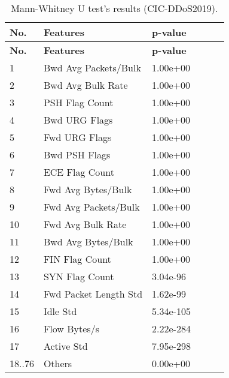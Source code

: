 \begin{center}
    \begin{longtable}{|l|l|l|l|l|l|}
        \caption{Mann-Whitney U test’s results (CIC-DDoS2019).} \\

        \hline
        \textbf{No.} & \textbf{Features} & \textbf{p-value} \\
        \hline
        \endfirsthead

        \hline
        \textbf{No.} & \textbf{Features} & \textbf{p-value} \\
        \hline
        \endhead

        1 & Bwd Avg Packets/Bulk & 1.00e+00 \\
        \hline
        2 & Bwd Avg Bulk Rate & 1.00e+00 \\
        \hline
        3 & PSH Flag Count & 1.00e+00 \\
        \hline
        4 & Bwd URG Flags & 1.00e+00 \\
        \hline
        5 & Fwd URG Flags & 1.00e+00 \\
        \hline
        6 & Bwd PSH Flags & 1.00e+00 \\
        \hline
        7 & ECE Flag Count & 1.00e+00 \\
        \hline
        8 & Fwd Avg Bytes/Bulk & 1.00e+00 \\
        \hline
        9 & Fwd Avg Packets/Bulk & 1.00e+00 \\
        \hline
        10 & Fwd Avg Bulk Rate & 1.00e+00 \\
        \hline
        11 & Bwd Avg Bytes/Bulk & 1.00e+00 \\
        \hline
        12 & FIN Flag Count & 1.00e+00 \\
        \hline
        13 & SYN Flag Count & 3.04e-96 \\
        \hline
        14 & Fwd Packet Length Std & 1.62e-99 \\
        \hline
        15 & Idle Std & 5.34e-105 \\
        \hline
        16 & Flow Bytes/s & 2.22e-284 \\
        \hline
        17 & Active Std & 7.95e-298 \\
        \hline
        18..76 & Others & 0.00e+00 \\
        \hline
    \end{longtable}
\end{center}
